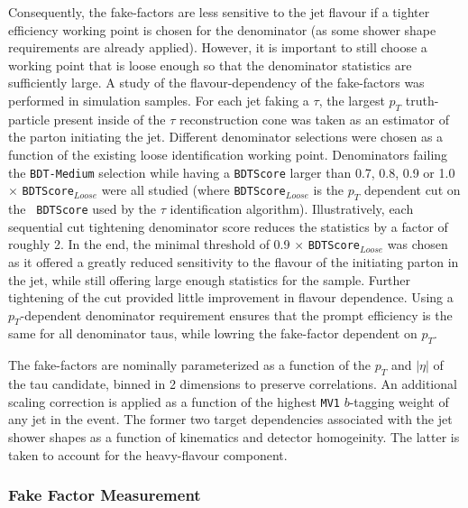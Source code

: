 Consequently, the fake-factors are less sensitive to the jet flavour if a tighter
efficiency working point is chosen for the denominator (as some shower shape requirements
are already applied).  However, it is important to still choose a working point that is
loose enough so that the denominator statistics are sufficiently large. A study of the
flavour-dependency of the fake-factors was performed in simulation samples.  For each jet
faking a $\tau$, the largest $p_{T}$ truth-particle present inside of the $\tau$
reconstruction cone was taken as an estimator of the parton initiating the jet.
Different denominator selections were chosen as a function of the existing loose
identification working point.  Denominators failing the \texttt{BDT-Medium} selection while
having a \texttt{BDTScore} larger than 0.7, 0.8, 0.9 or 1.0 $\times$ \texttt{BDTScore$_{Loose}$}
were all studied (where \texttt{BDTScore$_{Loose}$} is the $p_{T}$ dependent cut on the \texttt{  BDTScore} used by the $\tau$ identification algorithm).  Illustratively, each sequential
cut tightening denominator score reduces the statistics by a factor of roughly 2.  In the
end, the minimal threshold of 0.9 $\times$ \texttt{BDTScore$_{Loose}$} was chosen as it
offered a greatly reduced sensitivity to the flavour of the initiating parton in the jet,
while still offering large enough statistics for the sample. Further tightening of the cut
provided little improvement in flavour dependence. Using a $p_{T}$-dependent denominator
requirement ensures that the prompt efficiency is the same for all denominator taus, while
lowring the fake-factor dependent on $p_{T}$.


The fake-factors are nominally parameterized as a function of the $p_{T}$ and $|\eta|$ of the
tau candidate, binned in 2 dimensions to preserve correlations. An additional scaling
correction is applied as a function of the highest \texttt{MV1} $b$-tagging weight of any jet
in the event.  The former two target dependencies associated with the jet shower shapes as a
function of kinematics and detector homogeinity.  The latter is taken to account for the
heavy-flavour component.

\subsubsection{Fake Factor Measurement}\label{sec:model-independent-ff-tau-measurement}

